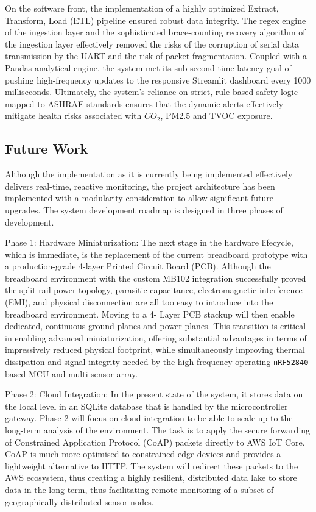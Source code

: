 \documentclass[conference]{IEEEtran}
\begin{document}
On the software front, the implementation of a highly optimized Extract, Transform, Load (ETL) pipeline ensured robust data integrity. The regex engine of the ingestion layer and the sophisticated brace-counting recovery algorithm of the ingestion layer effectively removed the risks of the corruption of serial data transmission by the UART and the risk of packet fragmentation. Coupled with a Pandas analytical engine, the system met its sub-second time latency goal of pushing high-frequency updates to the responsive Streamlit dashboard every 1000 milliseconds. Ultimately, the system’s reliance on strict, rule-based safety logic mapped to ASHRAE standards ensures that the dynamic alerts effectively mitigate health risks associated with $CO_2$, PM2.5 and TVOC exposure.

\subsection{Future Work}
Although the implementation as it is currently being implemented effectively delivers real-time, reactive monitoring, the project architecture has been implemented with a modularity consideration to allow significant future upgrades. The system development roadmap is designed in three phases of development.  

Phase 1: Hardware Miniaturization:
The next stage in the hardware lifecycle, which is immediate, is the replacement of the current breadboard prototype with a production-grade 4-layer Printed Circuit Board (PCB). Although the breadboard environment with the custom MB102 integration successfully proved the split rail power topology, parasitic capacitance, electromagnetic interference (EMI), and physical disconnection are all too easy to introduce into the breadboard environment. Moving to a 4- Layer PCB stackup will then enable dedicated, continuous ground planes and power planes. This transition is critical in enabling advanced miniaturization, offering substantial advantages in terms of impressively reduced physical footprint, while simultaneously improving thermal dissipation and signal integrity needed by the high frequency operating \texttt{nRF52840}-based MCU and multi-sensor array.  

Phase 2: Cloud Integration:
In the present state of the system, it stores data on the local level in an SQLite database that is handled by the microcontroller gateway. Phase 2 will focus on cloud integration to be able to scale up to the long-term analysis of the environment. The task is to apply the secure forwarding of Constrained Application Protocol (CoAP) packets directly to AWS IoT Core. CoAP is much more optimised to constrained edge devices and provides a lightweight alternative to HTTP. The system will redirect these packets to the AWS ecosystem, thus creating a highly resilient, distributed data lake to store data in the long term, thus facilitating remote monitoring of a subset of geographically distributed sensor nodes.  
\end{document}

